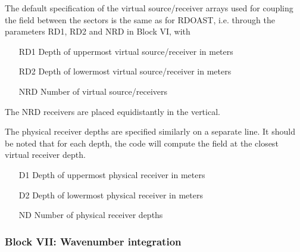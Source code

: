 The default specification of the virtual source/receiver arrays used for coupling the field between the sectors is the same as for
RDOAST, i.e. through the parameters RD1, RD2 and NRD in Block VI, with
\begin{itemize}
\item[RD1]  Depth of uppermost virtual source/receiver in meters
\item[RD2]  Depth of lowermost virtual source/receiver in meters
\item[NRD]   Number of virtual source/receivers 
\end{itemize}

The NRD receivers are placed equidistantly in the vertical.

The physical receiver depths are specified similarly on a separate
line. It should be noted that for each depth, the code will compute
the field at the closest virtual receiver depth.
\begin{itemize}
\item[D1]  Depth of uppermost physical receiver in meters
\item[D2]  Depth of lowermost physical receiver in meters
\item[ND]   Number of physical receiver depths 
\end{itemize}



\subsubsection{Block VII: Wavenumber integration}

